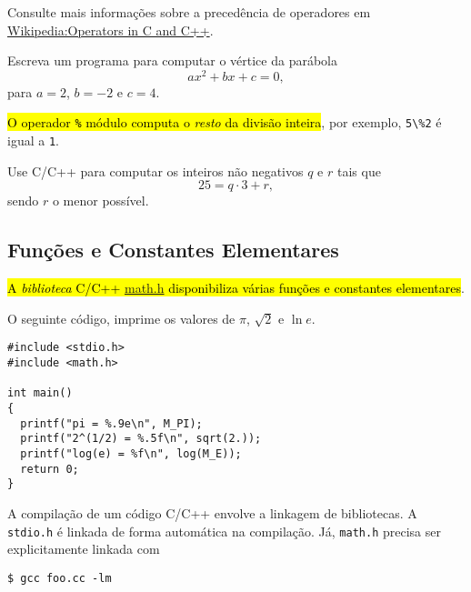 \documentclass[12pt]{article}
\begin{document}
\begin{obs}
Consulte mais informações sobre a precedência de operadores em \href{https://en.wikipedia.org/wiki/Operators_in_C_and_C\%2B\%2B#Operator_precedence}{Wikipedia:Operators in C and C++}.
\end{obs}

\begin{exr}
  Escreva um programa para computar o vértice da parábola
  \begin{equation}
    ax^2 + bx + c = 0,
  \end{equation}
  para $a = 2$, $b = -2$ e $c = 4$. 
\end{exr}

\hl{O operador \texttt{\%} módulo computa o \emph{resto} da divisão inteira}, por exemplo, \lstinline+5\%2+ é igual a \lstinline+1+.

\begin{exr}
  Use C/C++ para computar os inteiros não negativos $q$ e $r$ tais que
  \begin{equation}
    25 = q\cdot 3 + r,
  \end{equation}
  sendo $r$ o menor possível.
\end{exr}

\subsection{Funções e Constantes Elementares}

\hl{A \emph{biblioteca} C/C++ {\href{https://cplusplus.com/reference/cmath}{math.h}} disponibiliza várias funções e constantes elementares}.


\begin{ex}
  O seguinte código, imprime os valores de $\pi$, $\sqrt{2}$ e $\ln e$.
\begin{lstlisting}[caption=mat.cc]
#include <stdio.h>
#include <math.h>

int main()
{
  printf("pi = %.9e\n", M_PI);
  printf("2^(1/2) = %.5f\n", sqrt(2.));
  printf("log(e) = %f\n", log(M_E));
  return 0;
}
\end{lstlisting}
\end{ex}

\begin{obs}
  A compilação de um código C/C++ envolve a linkagem de bibliotecas. A \lstinline!stdio.h! é linkada de forma automática na compilação. Já, \lstinline!math.h! precisa ser explicitamente linkada com
\begin{lstlisting}
$ gcc foo.cc -lm
\end{lstlisting}
\end{obs}
\end{document}
